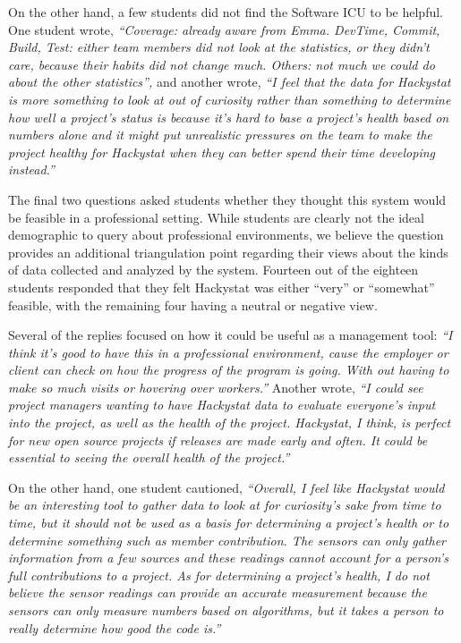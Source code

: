 \documentclass[10pt,twocolumn]{article}
\begin{document}
On the other hand, a few students did not find the Software ICU to be
helpful.  One student wrote, {\em ``Coverage: already aware from
Emma. DevTime, Commit, Build, Test: either team members did not look at the
statistics, or they didn't care, because their habits did not change
much. Others: not much we could do about the other statistics'',} and
another wrote, {\em ``I feel that the data for Hackystat is more something
to look at out of curiosity rather than something to determine how well a
project's status is because it's hard to base a project's health based on
numbers alone and it might put unrealistic pressures on the team to make
the project healthy for Hackystat when they can better spend their time
developing instead.''}


The final two questions asked students whether they thought this system
would be feasible in a professional setting.  While students are clearly
not the ideal demographic to query about professional environments, we
believe the question provides an additional triangulation point regarding
their views about the kinds of data collected and analyzed by the system.
Fourteen out of the eighteen students responded that they felt Hackystat
was either ``very'' or ``somewhat'' feasible, with the remaining four
having a neutral or negative view.

Several of the replies focused on how it could be useful as a management
tool: {\em ``I think it's good to have this in a professional environment,
cause the employer or client can check on how the progress of the program
is going. With out having to make so much visits or hovering over
workers.''} Another wrote, {\em ``I could see project managers wanting to
have Hackystat data to evaluate everyone's input into the project, as well
as the health of the project. Hackystat, I think, is perfect for new open
source projects if releases are made early and often. It could be essential
to seeing the overall health of the project.''}

On the other hand, one student cautioned, {\em ``Overall, I feel like
Hackystat would be an interesting tool to gather data to look at for
curiosity's sake from time to time, but it should not be used as a basis
for determining a project's health or to determine something such as member
contribution. The sensors can only gather information from a few sources
and these readings cannot account for a person's full contributions to a
project. As for determining a project's health, I do not believe the sensor
readings can provide an accurate measurement because the sensors can only
measure numbers based on algorithms, but it takes a person to really
determine how good the code is.''}
\end{document}
